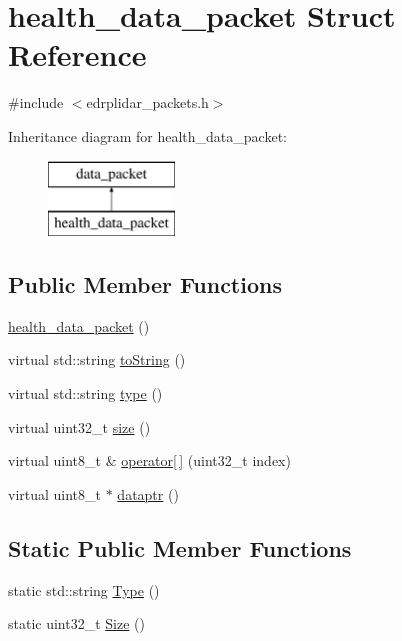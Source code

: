 \hypertarget{structhealth__data__packet}{\section{health\-\_\-data\-\_\-packet Struct Reference}
\label{structhealth__data__packet}
}


{\ttfamily \#include $<$edrplidar\-\_\-packets.\-h$>$}

Inheritance diagram for health\-\_\-data\-\_\-packet\-:\begin{figure}[H]
\begin{center}
\leavevmode
\includegraphics[height=2.000000cm]{structhealth__data__packet}
\end{center}
\end{figure}
\subsection*{Public Member Functions}
\begin{DoxyCompactItemize}
\item 
\hyperlink{structhealth__data__packet_a7cfb581955c8d81fc4b7a6aa98479553}{health\-\_\-data\-\_\-packet} ()
\item 
virtual std\-::string \hyperlink{structhealth__data__packet_a89e96e87bdcf2ecc52260a9d98e37995}{to\-String} ()
\item 
virtual std\-::string \hyperlink{structhealth__data__packet_abc386acf1fcf42086f1fc791d2718dff}{type} ()
\item 
virtual uint32\-\_\-t \hyperlink{structhealth__data__packet_a85329a68f718099b6cefcf65fab75077}{size} ()
\item 
virtual uint8\-\_\-t \& \hyperlink{structhealth__data__packet_aa96359c2b7100e17905e02c7ab68ca59}{operator\mbox{[}$\,$\mbox{]}} (uint32\-\_\-t index)
\item 
virtual uint8\-\_\-t $\ast$ \hyperlink{structhealth__data__packet_a8378ecf34528f77f6d50937c3ad02c8d}{dataptr} ()
\end{DoxyCompactItemize}
\subsection*{Static Public Member Functions}
\begin{DoxyCompactItemize}
\item 
static std\-::string \hyperlink{structhealth__data__packet_ab1066c5d4c3353c6d5175acef3b4fc9a}{Type} ()
\item 
static uint32\-\_\-t \hyperlink{structhealth__data__packet_a453e09780784287394585eedd99585f0}{Size} ()
\end{DoxyCompactItemize}
